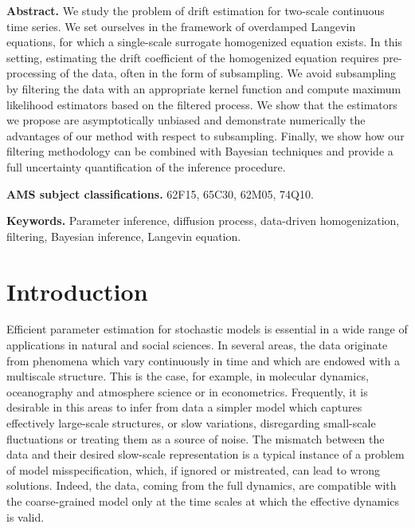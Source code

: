 \documentclass[10pt]{article}
\begin{document}
\maketitle	

\textbf{Abstract.} We study the problem of drift estimation for two-scale continuous time series. We set ourselves in the framework of overdamped Langevin equations, for which a single-scale surrogate homogenized equation exists. In this setting, estimating the drift coefficient of the homogenized equation requires pre-processing of the data, often in the form of subsampling. We avoid subsampling by filtering the data with an appropriate kernel function and compute maximum likelihood estimators based on the filtered process. We show that the estimators we propose are asymptotically unbiased and demonstrate numerically the advantages of our method with respect to subsampling. Finally, we show how our filtering methodology can be combined with Bayesian techniques and provide a full uncertainty quantification of the inference procedure.
 
\textbf{AMS subject classifications.} 62F15, 65C30, 62M05, 74Q10.

\textbf{Keywords.} Parameter inference, diffusion process, data-driven homogenization, filtering, Bayesian inference, Langevin equation.

\section{Introduction}

Efficient parameter estimation for stochastic models is essential in a wide range of applications in natural and social sciences. In several areas, the data originate from phenomena which vary continuously in time and which are endowed with a multiscale structure. This is the case, for example, in molecular dynamics, oceanography and atmosphere science or in econometrics. Frequently, it is desirable in this areas to infer from data a simpler model which captures effectively large-scale structures, or slow variations, disregarding small-scale fluctuations or treating them as a source of noise. The mismatch between the data and their desired slow-scale representation is a typical instance of a problem of model misspecification, which, if ignored or mistreated, can lead to wrong solutions. Indeed, the data, coming from the full dynamics, are compatible with the coarse-grained model only at the time scales at which the effective dynamics is valid.
\end{document}

